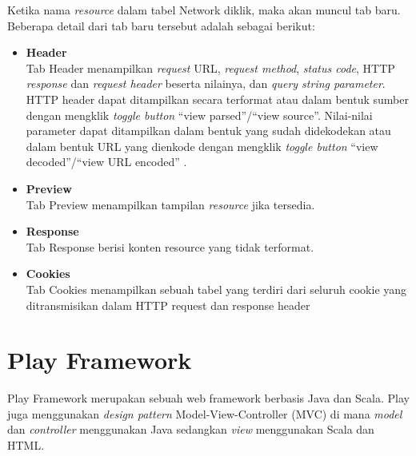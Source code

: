 Ketika nama \textit{resource} dalam tabel Network diklik, maka akan muncul tab baru. Beberapa detail dari tab baru tersebut adalah sebagai berikut:
\begin{itemize}
	\item \textbf{Header}\\
	Tab Header menampilkan \textit{request} URL, \textit{request method}, \textit{status code}, HTTP \textit{response} dan \textit{request header} beserta nilainya, dan \textit{query string parameter}. HTTP header dapat ditampilkan secara terformat atau dalam bentuk sumber dengan mengklik \textit{toggle button} "`view parsed"'/"`view source"'. Nilai-nilai parameter dapat ditampilkan dalam bentuk yang sudah didekodekan atau dalam bentuk URL yang dienkode dengan mengklik \textit{toggle button} "`view decoded"'/"`view URL encoded"' .
	\item \textbf{Preview}\\
	Tab Preview menampilkan tampilan \textit{resource} jika tersedia.
	\item \textbf{Response}\\
	Tab Response berisi konten resource yang tidak terformat.
	\item \textbf{Cookies}\\
	Tab Cookies menampilkan sebuah tabel yang terdiri dari seluruh cookie yang ditransmisikan dalam HTTP request dan response header
\end{itemize}

\section{Play Framework}
\label{sec:play}

Play Framework \cite{Leroux:2014} merupakan sebuah web framework berbasis Java dan Scala. Play juga menggunakan \textit{design pattern} Model-View-Controller (MVC) di mana \textit{model} dan \textit{controller} menggunakan Java sedangkan \textit{view} menggunakan Scala dan HTML. 
